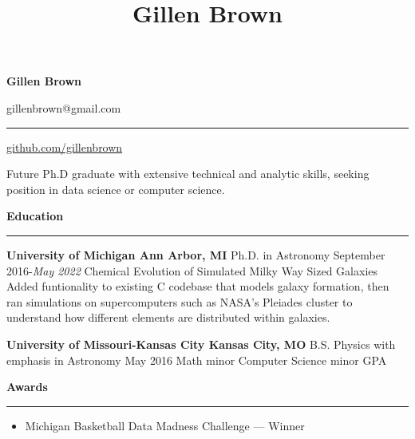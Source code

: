 \documentclass[10pt]{article}
\title{Gillen Brown}
\newcommand{\header}[1]{\vspace{2em}\par \textbf{\large #1}\strut\hrule\vspace{0em}}
\newcommand{\actionHeader}[2]{\textbf{#1 \hfill #2}}
\newcommand{\indentedItemDate}[2]{\newline\null\qquad #1 \hfill #2}
\newcommand{\indentedItem}[1]{\newline\null\qquad #1}
\begin{document}
\thispagestyle{empty}


\begin{center}
{\huge \bf Gillen Brown}

{\Large gillenbrown@gmail.com \enspace \rule[-5pt]{1pt}{20pt} \enspace \href{http://www.github.com/gillenbrown}{github.com/gillenbrown}}

\bigskip

\parbox[c][2em][s]{0.8\textwidth}{\center \large Future Ph.D graduate with extensive technical and analytic skills, seeking position in data science or computer science.}

\bigskip

\end{center}

\header{Education}
\actionHeader{University of Michigan}{Ann Arbor, MI}
\indentedItemDate{Ph.D. in Astronomy}{September 2016-{\it May 2022}}
\indentedItem{{\bf Topic:} Chemical Evolution of Simulated Milky Way Sized Galaxies}
\indentedItem{{\bf Summary:} Added funtionality to existing C codebase that models galaxy formation, then ran }
\indentedItem{simulations on supercomputers such as NASA's Pleiades cluster to understand how different elements}
\indentedItem{are distributed within galaxies.}

\actionHeader{University of Missouri-Kansas City}{Kansas City, MO}
\indentedItemDate{B.S. Physics with emphasis in Astronomy}{May 2016}
\indentedItem{Math minor}
\indentedItem{Computer Science minor}
\indentedItem{4.0 GPA}

\header{Awards}
\begin{itemize}
    \item Michigan Basketball Data Madness Challenge --- Winner
\end{itemize}
\end{document}

